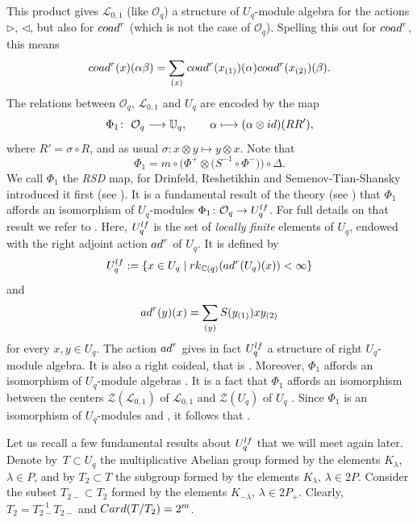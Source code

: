 \documentclass[11pt]{article}
\numberwithin{equation}{section}
\numberwithin{equation}{section}
\theoremstyle{definition}
\newcommand{\mUq}{\mathbb{U}_q}
\newcommand{\mc}{\mathbb{C}}
\newcommand{\Ll}{{\mathcal L}}
\newcommand{\Oo}{{\mathcal O}}
\newcommand{\ra}{\rightarrow}
\begin{document}
This product gives $\Ll_{0,1}$ (like $\Oo_q$) a structure of $U_q$-module algebra for the actions $\rhd$, $\lhd$, but also for ${\rm coad}^r$ (which is not the case of $\Oo_q$). Spelling this out for ${\rm coad}^r$, this means
\[{\rm coad}^r(x)(\alpha\beta)=\sum_{(x)}{\rm coad}^r(x_{(1)})(\alpha){\rm coad}^r(x_{(2)})(\beta).\]
The relations between $\Oo_q$, $\Ll_{0,1}$ and $U_q$ are encoded by the map
\begin{equation}\label{phi1def}
\Phi_1\colon\ \Oo_q\longrightarrow \mUq, \qquad \alpha\longmapsto(\alpha \otimes {\rm id})(RR'),
\end{equation}
where $R' = \sigma\circ R$, and as usual $\sigma\colon x\otimes y \mapsto y\otimes x$. Note that
\begin{equation}\label{RSDmapdef}
\Phi_1 = m\circ \big(\Phi^+\otimes \big(S^{-1}\circ \Phi^-{}\big)\big)\circ \Delta.
\end{equation}
We call $\Phi_1$ the {\it RSD} map, for Drinfeld, Reshetikhin and Semenov-Tian-Shansky introduced it first (see \cite{Dr,Maj,RSTS}). It is a fundamental result of the theory (see \cite{Bau1,Ca,Jos}) that $\Phi_1$ affords an isomorphism of $U_q$-modules
$\Phi_1\colon \Oo_q \ra U_q^{\rm lf}$.
For full details on that result we refer to \cite[Section 3.12]{VY}. Here, $U_q^{\rm lf}$ is the set of \emph{locally finite} elements of $U_q$, endowed with the right adjoint action ${\rm ad}^r$ of $U_q$. It is defined by
\[U_q^{\rm lf} :=\{x\in U_q\mid {\rm rk}_{\mc(q)}({\rm ad}^r(U_q)(x)) < \infty\}\]
and
\[{\rm ad}^r(y)(x) = \sum_{(y)}{S}(y_{(1)}) x y_{(2)}\]
for every $x,y \in U_q$. The action ${\rm ad}^r$ gives in fact $U_q^{\rm lf}$ a structure of right $U_q$-module algebra. It is also a right coideal, that is . Moreover, $\Phi_1$ affords an isomorphism of $U_q$-module algebras \smash{$
\Phi_1\colon \Ll_{0,1} \ra U_q^{\rm lf}$}.
It is a fact that $\Phi_1$ affords an isomorphism between the centers $\mathcal{Z}(\Ll_{0,1})$ of $\Ll_{0,1}$ and $\mathcal{Z}(U_q)$ of $U_q$ \cite[Proposition~6.24]{BR}. Since $\Phi_1$ is an isomorphism of $U_q$-modules and , it follows that \smash{$\mathcal{Z}(\Ll_{0,1}) = \Ll_{0,1}^{U_q}$}.

Let us recall a few fundamental results about $U_q^{\rm lf}$ that we will meet again later. Denote by~${T\subset U_q}$ the multiplicative Abelian group formed by the elements $K_{\lambda}$, $\lambda \in P$, and by $T_2\subset T$ the subgroup formed by the elements $K_{\lambda}$, $\lambda \in 2P$. Consider the subset $T_{2-} \subset T_2$ formed by the elements $K_{-\lambda}$, $\lambda \in 2P_+$. Clearly, $T_2 = T_{2-}^{-1}T_{2-}$ and ${\rm Card}(T/T_2) = 2^m$.
\end{document}
